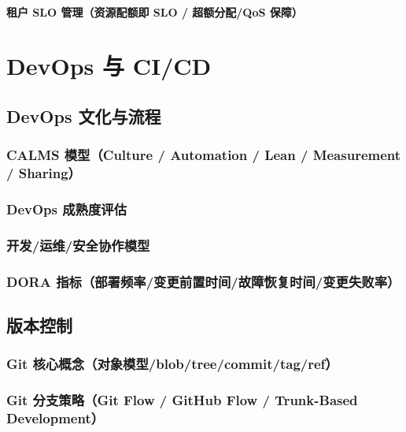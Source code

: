 \documentclass[12pt,UTF8]{ctexbook}
\begin{document}
    \subsection{租户 SLO 管理（资源配额即 SLO / 超额分配/QoS 保障）}



\part{DevOps 与 CI/CD}

\chapter{DevOps 文化与流程}
\label{chap:devops-culture}

  \section{CALMS 模型（Culture / Automation / Lean / Measurement / Sharing）}
  \section{DevOps 成熟度评估}
  \section{开发/运维/安全协作模型}
  \section{DORA 指标（部署频率/变更前置时间/故障恢复时间/变更失败率）}

\chapter{版本控制}
\label{chap:version-control}

  \section{Git 核心概念（对象模型/blob/tree/commit/tag/ref）}
  \section{Git 分支策略（Git Flow / GitHub Flow / Trunk-Based Development）}
\end{document}
